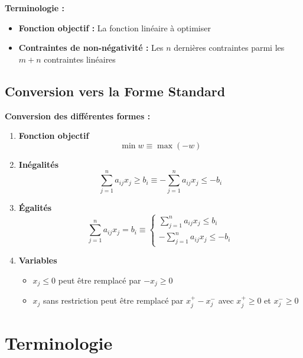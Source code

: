 \documentclass[12pt,a4paper]{article}
\begin{document}
\begin{astuce}
\textbf{Terminologie :}
\begin{itemize}
    \item \textbf{Fonction objectif :} La fonction linéaire à optimiser
    \item \textbf{Contraintes de non-négativité :} Les $n$ dernières contraintes parmi les $m + n$ contraintes linéaires
\end{itemize}
\end{astuce}

\newpage
\subsection{Conversion vers la Forme Standard}

\begin{methode}
\textbf{Conversion des différentes formes :}

\begin{enumerate}
    \item \textcolor{titrebleu}{\textbf{Fonction objectif}}
    $$\min w \equiv \max (-w)$$
    
    \item \textcolor{defvert}{\textbf{Inégalités}}
    $$\sum_{j=1}^{n} a_{ij}x_j \geq b_i \equiv -\sum_{j=1}^{n} a_{ij}x_j \leq -b_i$$
    
    \item \textcolor{algoviolet}{\textbf{Égalités}}
    $$\sum_{j=1}^{n} a_{ij}x_j = b_i \equiv \begin{cases}
    \sum_{j=1}^{n} a_{ij}x_j \leq b_i\\
    -\sum_{j=1}^{n} a_{ij}x_j \leq -b_i
    \end{cases}$$
    
    \item \textcolor{exempleorange}{\textbf{Variables}}
    \begin{itemize}
        \item $x_j \leq 0$ peut être remplacé par $-x_j \geq 0$
        \item $x_j$ sans restriction peut être remplacé par $x_j^+ - x_j^-$ avec $x_j^+ \geq 0$ et $x_j^- \geq 0$
    \end{itemize}
\end{enumerate}
\end{methode}

\newpage
\section{Terminologie}
\end{document}
